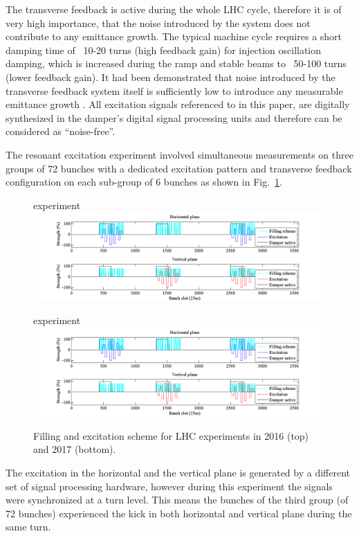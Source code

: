 \documentclass[%
 reprint,
 amsmath,amssymb,
 aps,
prstab,
]{revtex4-1}
\begin{document}
The transverse feedback is active during the whole LHC cycle, therefore it is of very high importance, that the noise introduced by the system does not contribute to any emittance growth. The typical machine cycle requires a short damping time of ~10-20 turns (high feedback gain) for injection oscillation damping, which is increased during the ramp and stable beams to ~50-100 turns (lower feedback gain). It had been demonstrated that noise introduced by the transverse feedback system itself is sufficiently low to introduce any measurable emittance growth \cite{adt_noise_emit_2017}. All excitation signals referenced to in this paper, are digitally synthesized in the damper's digital signal processing units and therefore can be considered as ``noise-free''.

The resonant excitation experiment involved simultaneous measurements on three groups of 72 bunches with a dedicated excitation pattern and transverse feedback configuration on each sub-group of 6 bunches as shown in Fig.~\ref{fig:fill}.
\begin{figure}
	\begin{minipage}[t]{1.0\linewidth}
		 experiment
		\includegraphics[width=1.0\linewidth]{bunchfilling.png}	
	\end{minipage}
	\begin{minipage}[t]{1.0\linewidth}
	 experiment
	\includegraphics[width=1.0\linewidth]{bunchfilling.png}	
	\end{minipage}
	\caption{\label{fig:fill} Filling and excitation scheme for LHC experiments in 2016 (top) and 2017 (bottom).}
\end{figure}

The excitation in the horizontal and the vertical plane is generated by a different set of signal processing hardware, however during this experiment the signals were synchronized at a turn level. This means the bunches of the third group (of 72 bunches) experienced the kick in both horizontal and vertical plane during the same turn.
\end{document}
